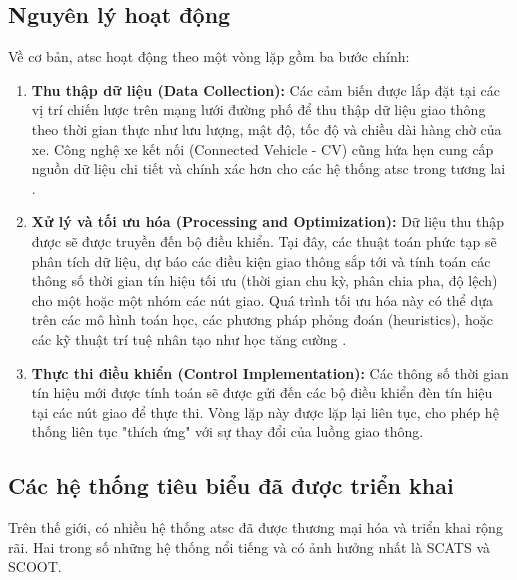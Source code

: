 \subsection{Nguyên lý hoạt động}
Về cơ bản, \ac{atsc} hoạt động theo một vòng lặp gồm ba bước chính:
\begin{enumerate}
    \item \textbf{Thu thập dữ liệu (Data Collection):} Các cảm biến được lắp đặt
        tại các vị trí chiến lược trên mạng lưới đường phố để thu thập dữ liệu
        giao thông theo thời gian thực như lưu lượng, mật độ, tốc độ và chiều
        dài hàng chờ của xe. Công nghệ xe kết nối (Connected Vehicle - CV) cũng hứa
        hẹn cung cấp nguồn dữ liệu chi tiết và chính xác hơn cho các hệ thống \ac{atsc}
        trong tương lai \cite{Wang2018}.

    \item \textbf{Xử lý và tối ưu hóa (Processing and Optimization):} Dữ liệu
        thu thập được sẽ được truyền đến bộ điều khiển. Tại đây, các thuật toán
        phức tạp sẽ phân tích dữ liệu, dự báo các điều kiện giao thông sắp tới và
        tính toán các thông số thời gian tín hiệu tối ưu (thời gian chu kỳ, phân
        chia pha, độ lệch) cho một hoặc một nhóm các nút giao. Quá trình tối ưu
        hóa này có thể dựa trên các mô hình toán học, các phương pháp phỏng đoán
        (heuristics), hoặc các kỹ thuật trí tuệ nhân tạo như học tăng cường
        \cite{Wei2019}.

    \item \textbf{Thực thi điều khiển (Control Implementation):} Các thông số
        thời gian tín hiệu mới được tính toán sẽ được gửi đến các bộ điều khiển
        đèn tín hiệu tại các nút giao để thực thi. Vòng lặp này được lặp lại liên
        tục, cho phép hệ thống liên tục "thích ứng" với sự thay đổi của luồng
        giao thông.
\end{enumerate}

\subsection{Các hệ thống tiêu biểu đã được triển khai}
Trên thế giới, có nhiều hệ thống \ac{atsc} đã được thương mại hóa và triển khai
rộng rãi. Hai trong số những hệ thống nổi tiếng và có ảnh hưởng nhất là SCATS và
SCOOT.

